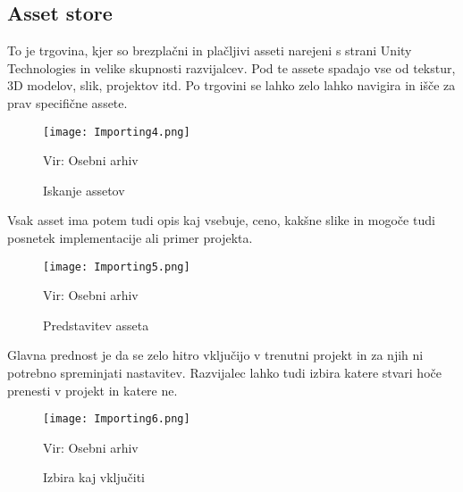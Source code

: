 {\color{indiagreen}\subsection{Asset store}}
To je trgovina, kjer so brezplačni in plačljivi asseti narejeni s strani Unity Technologies in velike skupnosti razvijalcev. Pod te assete spadajo vse od tekstur, 3D modelov, slik, projektov itd. Po trgovini se lahko zelo lahko navigira in išče za prav specifične assete.\\
\begin{figure}[ht!]
	\centering
	\texttt{[image: Importing4.png]}
	\caption{Iskanje assetov}
	{\tiny Vir: Osebni arhiv}
\end{figure}
Vsak asset ima potem tudi opis kaj vsebuje, ceno, kakšne slike in mogoče tudi posnetek implementacije ali primer projekta.\\
\begin{figure}[ht!]
	\centering
	\texttt{[image: Importing5.png]}
	\caption{Predstavitev asseta}
	{\tiny Vir: Osebni arhiv}
\end{figure}
Glavna prednost je da se zelo hitro vključijo v trenutni projekt in za njih ni potrebno spreminjati nastavitev. Razvijalec lahko tudi izbira katere stvari hoče prenesti v projekt in katere ne.\\
\begin{figure}[ht!]
	\centering
	\texttt{[image: Importing6.png]}
	\caption{Izbira kaj vključiti}
	{\tiny Vir: Osebni arhiv}
\end{figure}